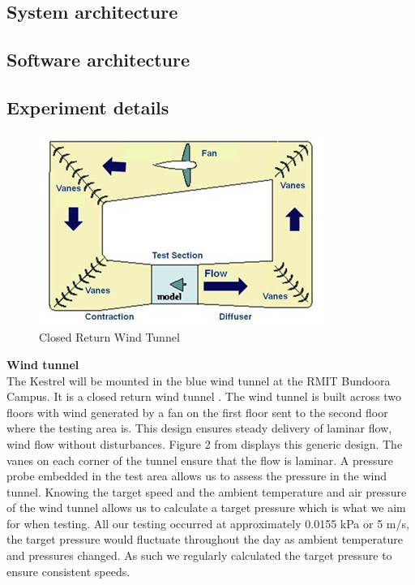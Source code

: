     \subsection{System architecture}

    \subsection{Software architecture}

    \subsection{Experiment details}
    \setlength{\intextsep}{0pt}
    \begin{figure}
        \includegraphics[width=\textwidth/2]{./Resources/Fig2_wind_tunnel_design.jpg}
        \caption{\label{fig:figure 2} Closed Return Wind Tunnel \cite{10}}
    \end{figure}
    \quad\textbf{Wind tunnel}\\
    The Kestrel will be mounted in the blue wind tunnel at the RMIT
    Bundoora Campus. It is a closed return wind tunnel \cite{11}. The
    wind tunnel is built across two floors with wind generated by a fan on
    the first floor sent to the second floor where the testing area is.
    This design ensures steady delivery of laminar flow, wind flow without
    disturbances. Figure 2 from displays this generic design. The vanes on
    each corner of the tunnel ensure that the flow is laminar. 
    \vspace{\baselineskip}
    A pressure probe embedded in the test area allows us to assess the
    pressure in the wind tunnel. Knowing the target speed and the ambient
    temperature and air pressure of the wind tunnel allows us to calculate
    a target pressure which is what we aim for when testing. All our testing
    occurred at approximately 0.0155 kPa or 5 m/s, the target pressure would
    fluctuate throughout the day as ambient temperature and pressures
    changed. As such we regularly calculated the target pressure to ensure
    consistent speeds.
    \vspace{\baselineskip}

